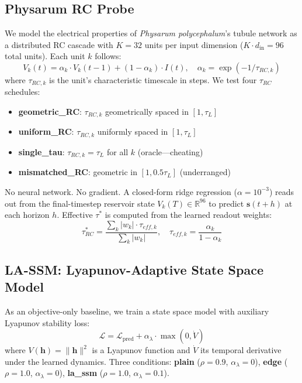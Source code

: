 \documentclass[12pt]{article}
\theoremstyle{definition}
\begin{document}
\subsection{Physarum RC Probe}

We model the electrical properties of \emph{Physarum polycephalum}'s tubule network
as a distributed RC cascade with $K=32$ units per input dimension ($K \cdot d_{\text{in}}
= 96$ total units). Each unit $k$ follows:
\begin{equation}
  V_k(t) = \alpha_k \cdot V_k(t-1) + (1-\alpha_k) \cdot I(t), \quad
  \alpha_k = \exp(-1/\tau_{RC,k})
\end{equation}
where $\tau_{RC,k}$ is the unit's characteristic timescale in steps. We test four
$\tau_{RC}$ schedules:
\begin{itemize}
  \item \textbf{geometric\_RC}: $\tau_{RC,k}$ geometrically spaced in $[1, \tau_L]$
  \item \textbf{uniform\_RC}: $\tau_{RC,k}$ uniformly spaced in $[1, \tau_L]$
  \item \textbf{single\_tau}: $\tau_{RC,k} = \tau_L$ for all $k$ (oracle---cheating)
  \item \textbf{mismatched\_RC}: geometric in $[1, 0.5\tau_L]$ (underranged)
\end{itemize}
No neural network. No gradient. A closed-form ridge regression
($\alpha = 10^{-3}$) reads out from the final-timestep reservoir state
$V_k(T) \in \mathbb{R}^{96}$ to predict $\mathbf{s}(t+h)$ at each horizon $h$.
Effective $\tau^*$ is computed from the learned readout weights:
\begin{equation}
  \tau^*_{RC} = \frac{\sum_k |w_k| \cdot \tau_{eff,k}}{\sum_k |w_k|}, \quad
  \tau_{eff,k} = \frac{\alpha_k}{1-\alpha_k}
\end{equation}

\subsection{LA-SSM: Lyapunov-Adaptive State Space Model}

As an objective-only baseline, we train a state space model with auxiliary Lyapunov
stability loss:
\begin{equation}
  \mathcal{L} = \mathcal{L}_{\text{pred}} + \alpha_\lambda \cdot \max(0, \dot{V})
\end{equation}
where $V(\mathbf{h}) = \|\mathbf{h}\|^2$ is a Lyapunov function and $\dot{V}$ its
temporal derivative under the learned dynamics. Three conditions: \textbf{plain}
($\rho=0.9$, $\alpha_\lambda=0$), \textbf{edge} ($\rho=1.0$, $\alpha_\lambda=0$),
\textbf{la\_ssm} ($\rho=1.0$, $\alpha_\lambda=0.1$).
\end{document}
